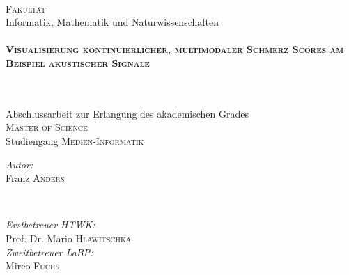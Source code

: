 \begin{titlepage}
\begin{minipage}{0.48\textwidth}
\end{minipage}\\[1cm]





\large \textsc{Fakultät} \\ Informatik, Mathematik und Naturwissenschaften\\[0.5cm] %


\HRule \\[0.4cm]
{ \huge \bfseries \textsc{Visualisierung kontinuierlicher, multimodaler Schmerz Scores am \\[0.3cm] Beispiel akustischer Signale}}
\subtitle{Masterarbeit}\\[0.2cm] %
\HRule \\[0.5cm]
 
\large Abschlussarbeit zur Erlangung des akademischen Grades \\ 
\textsc{Master of Science}\\[2cm]

\large Studiengang \textsc{Medien-Informatik}\\[3.5cm]


\begin{minipage}{0.4\textwidth}
\begin{flushleft} \large
\emph{Autor:}\\
Franz \textsc{Anders} %
\end{flushleft}
\end{minipage}
~
\begin{minipage}{0.4\textwidth}
\begin{flushright} \large
\emph{Erstbetreuer HTWK:} \\
Prof. Dr. Mario \textsc{Hlawitschka} %
\\[0.5cm]
\emph{Zweitbetreuer LaBP:} \\
Mirco \textsc{Fuchs}
\end{flushright}
\end{minipage}\\[1.5cm]


\end{titlepage}
